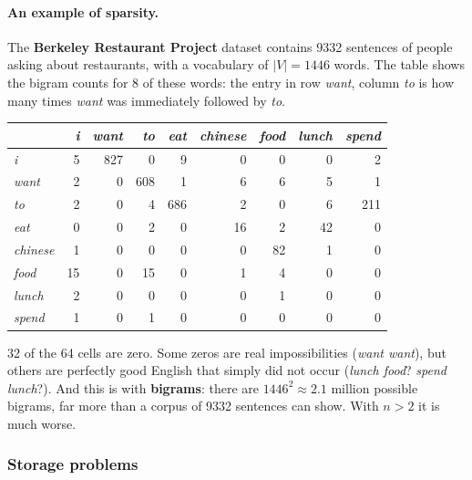 \paragraph{An example of sparsity.}
The \textbf{Berkeley Restaurant Project} dataset contains 9332 sentences of people
asking about restaurants, with a vocabulary of $|V| = 1446$ words. The table shows the
bigram counts for 8 of these words: the entry in row \emph{want}, column \emph{to} is
how many times \emph{want} was immediately followed by \emph{to}.

\begin{center}
\small
\begin{tabular}{@{}l*{8}{r}@{}}
\toprule
 & \emph{i} & \emph{want} & \emph{to} & \emph{eat} & \emph{chinese} & \emph{food} &
   \emph{lunch} & \emph{spend} \\
\midrule
\emph{i}       & 5  & 827 & 0  & 9   & 0 & 0 & 0 & 2   \\
\emph{want}    & 2  & 0  & 608 & 1   & 6  & 6  & 5  & 1   \\
\emph{to}      & 2  & 0  & 4   & 686 & 2  & 0 & 6  & 211 \\
\emph{eat}     & 0 & 0  & 2   & 0  & 16 & 2  & 42 & 0  \\
\emph{chinese} & 1  & 0  & 0  & 0  & 0 & 82 & 1  & 0  \\
\emph{food}    & 15 & 0  & 15  & 0  & 1  & 4  & 0 & 0  \\
\emph{lunch}   & 2  & 0  & 0  & 0  & 0 & 1  & 0 & 0  \\
\emph{spend}   & 1  & 0  & 1   & 0  & 0 & 0 & 0 & 0  \\
\bottomrule
\end{tabular}
\label{tab:berkeley-bigrams}
\end{center}

32 of the 64 cells are zero. Some zeros are real impossibilities (\emph{want want}),
but others are perfectly good English that simply did not occur (\emph{lunch food}?
\emph{spend lunch}?). And this is with \textbf{bigrams}: there are
$1446^2 \approx 2.1$ million possible bigrams, far more than a corpus of 9332 sentences
can show. With $n > 2$ it is much worse.

\subsubsection{Storage problems}

